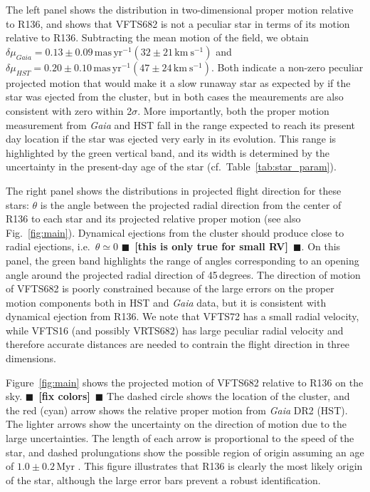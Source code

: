 \documentclass[apjl,twocolumn]{emulateapj}
\newcommand{\todo}[1]{{\large $\blacksquare$~\textbf{\color{red}[#1]}}~$\blacksquare$}
\newcommand{\kms}{{\,\mathrm{km\ s^{-1}}}}
\newcommand{\masyr}{\,\mathrm{mas}\,\mathrm{yr}^{-1}}
\DeclareRobustCommand{\Figref}[1]{Fig.~\ref{#1}}
\DeclareRobustCommand{\Tabref}[1]{Table~\ref{#1}}
\begin{document}
The left panel shows the distribution in two-dimensional proper motion relative
to R136, and shows that VFTS682 is not a peculiar star in terms of
its motion relative to R136. Subtracting the mean motion of the field,
we obtain $\delta \mu_{Gaia}=0.13\pm 0.09\masyr (32\pm 21\kms)$ and
$\delta \mu_{HST}=0.20\pm 0.10\masyr (47 \pm 24\kms )$. Both indicate
a non-zero peculiar projected motion that would make it a slow runaway
star as expected by \cite{bestenlehner:11} if the star was ejected
from the cluster,  but in both cases the meaurements are also consistent with zero within 2$\sigma$. 
More importantly, both the proper motion
measurement from \emph{Gaia} and HST fall in the range expected to
reach its present day location %
if the
star was ejected very early in its evolution. This range is
highlighted by the green vertical band, and its width is determined by
the uncertainty in the present-day age of the star (cf.~\Tabref{tab:star_param}).

The right panel shows the distributions in projected flight direction for these
stars: $\theta$ is the angle between the projected radial direction from the
center of R136 to each star and its projected relative proper motion (see also \Figref{fig:main}). Dynamical ejections from the
cluster should %
produce
close to radial ejections, i.e.~$\theta\simeq0$ \todo{this is only
  true for small RV}. On this panel, the green band highlights
the range of angles corresponding to an opening angle around the
projected radial direction of 45\,degrees. The direction of motion of VFTS682 is
poorly constrained because of the large errors on the proper motion
components both in HST and \emph{Gaia} data, but
it is consistent with dynamical ejection from R136. We note that
VFTS72 has a small radial velocity, while VFTS16 (and possibly VRTS682) has
large peculiar radial velocity and therefore accurate distances are
needed to contrain the flight direction in three dimensions.

Figure~\ref{fig:main} shows the projected motion of VFTS682 relative to R136 on the
sky. \todo{fix colors} The dashed circle shows the location of the cluster, and the red
(cyan) arrow shows the relative proper motion from \emph{Gaia} DR2
(HST). The lighter arrows show the uncertainty on the direction of
motion due to the large uncertainties. The length of each arrow is proportional to
the speed of the star, and dashed prolungations show the possible
region of origin assuming an age of $1.0\pm0.2$\,Myr
\citep[][]{schneider:18}. This figure illustrates that R136 is clearly
the most likely origin of the star, although the large error bars
prevent a robust identification. 
\end{document}
